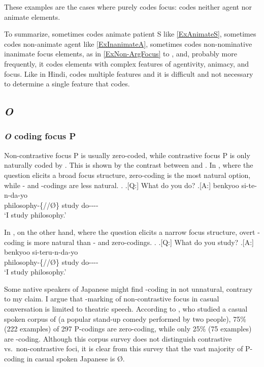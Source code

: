 These examples are the cases where  purely codes focus:
 codes neither agent nor animate elements.


To summarize,
 sometimes codes animate patient S like \ref{ExAnimateS},
sometimes codes non-animate agent like \ref{ExInanimateA},
sometimes codes non-nominative inanimate focus elements, as in \ref{ExNon-ArgFocus} to \Last, and,
probably more frequently,
it codes elements with complex features of agentivity, animacy, and focus.
Like  in Hindi,
 codes multiple features
and it is difficult and not necessary to determine a single feature that  codes.


\subsection{\textit{O}}

\subsubsection{\textit{O} coding focus P}

Non-contrastive focus P is usually zero-coded,
while contrastive focus P is only naturally coded by .
This is shown by the contrast between \Next and \NNext.
In \Next,
where the question elicits a broad focus structure,
zero-coding is the most natural option,
while - and -codings are less natural.
%
\ex.\label{ExfocusP}
	\a.[Q:] What do you do?
	\bg.[A:]  benkyoo si-te-n-da-yo \\
		philosophy-\{//\O\} study do---- \\
		`I study philosophy.'

In \Next,
on the other hand,
where the question elicits a narrow focus structure,
overt -coding is more natural than - and zero-codings.
%
\ex. 
	\a.[Q:] What do you study?
	\bg.[A:]  benkyoo si-teru-n-da-yo \\
		philosophy-\{//\O\} study do---- \\
		`I study philosophy.'


Some native speakers of Japanese might find -coding in \LLast not unnatural, contrary to my claim.
I argue that -marking of non-contrastive focus in casual conversation
is limited to theatric speech.
According to ,
who studied a casual spoken corpus of 
(a popular stand-up comedy performed by two people),
75\% (222 examples) of 297 P-codings are zero-coding,
while only 25\% (75 examples) are -coding.
Although this corpus survey does not distinguish contrastive vs.\ non-contrastive foci,
it is clear from this survey that
the vast majority of P-coding in casual spoken Japanese is {\O}.

